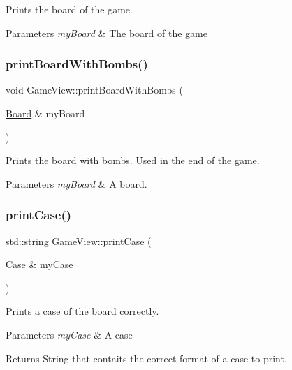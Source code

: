 Prints the board of the game. 


\begin{DoxyParams}{Parameters}
{\em my\+Board} & The board of the game \\
\hline
\end{DoxyParams}
\mbox{\label{class_game_view_a49a3340e0710fdaa7ae7a24711639427}} 
\subsubsection{\texorpdfstring{print\+Board\+With\+Bombs()}{printBoardWithBombs()}}
{\footnotesize\ttfamily void Game\+View\+::print\+Board\+With\+Bombs (\begin{DoxyParamCaption}\item[{\hyperlink{class_board}{Board} \&}]{my\+Board }\end{DoxyParamCaption})}



Prints the board with bombs. Used in the end of the game. 


\begin{DoxyParams}{Parameters}
{\em my\+Board} & A board. \\
\hline
\end{DoxyParams}
\mbox{\label{class_game_view_a40206044e0f9c6b5a8f679400666436a}} 
\subsubsection{\texorpdfstring{print\+Case()}{printCase()}}
{\footnotesize\ttfamily std\+::string Game\+View\+::print\+Case (\begin{DoxyParamCaption}\item[{\hyperlink{class_case}{Case} \&}]{my\+Case }\end{DoxyParamCaption})}



Prints a case of the board correctly. 


\begin{DoxyParams}{Parameters}
{\em my\+Case} & A case \\
\hline
\end{DoxyParams}
\begin{DoxyReturn}{Returns}
String that contaits the correct format of a case to print. 
\end{DoxyReturn}
\mbox{\label{class_game_view_a075aedb2174abafec7b6789906fcb277}} 
